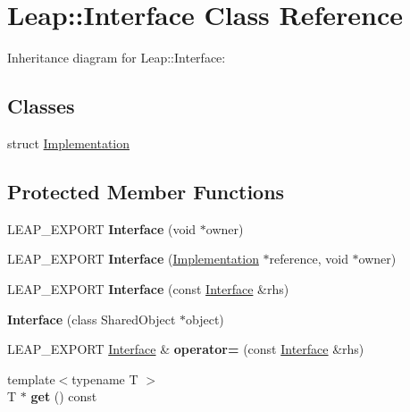 \hypertarget{class_leap_1_1_interface}{}\section{Leap\+:\+:Interface Class Reference}
\label{class_leap_1_1_interface}


Inheritance diagram for Leap\+:\+:Interface\+:
\subsection*{Classes}
\begin{DoxyCompactItemize}
\item 
struct \hyperlink{struct_leap_1_1_interface_1_1_implementation}{Implementation}
\end{DoxyCompactItemize}
\subsection*{Protected Member Functions}
\begin{DoxyCompactItemize}
\item 
\mbox{\label{class_leap_1_1_interface_ac3a173f44d98821f915ae5a873c478dc}} 
L\+E\+A\+P\+\_\+\+E\+X\+P\+O\+RT {\bfseries Interface} (void $\ast$owner)
\item 
\mbox{\label{class_leap_1_1_interface_a0e76882987c7866e17856c699b2490a8}} 
L\+E\+A\+P\+\_\+\+E\+X\+P\+O\+RT {\bfseries Interface} (\hyperlink{struct_leap_1_1_interface_1_1_implementation}{Implementation} $\ast$reference, void $\ast$owner)
\item 
\mbox{\label{class_leap_1_1_interface_a540323027de8d874d86f4ad09f5b7103}} 
L\+E\+A\+P\+\_\+\+E\+X\+P\+O\+RT {\bfseries Interface} (const \hyperlink{class_leap_1_1_interface}{Interface} \&rhs)
\item 
\mbox{\label{class_leap_1_1_interface_a48b7660b77d962b30fa397919901967b}} 
{\bfseries Interface} (class Shared\+Object $\ast$object)
\item 
\mbox{\label{class_leap_1_1_interface_a763c07d957f412613423acf2c9830275}} 
L\+E\+A\+P\+\_\+\+E\+X\+P\+O\+RT \hyperlink{class_leap_1_1_interface}{Interface} \& {\bfseries operator=} (const \hyperlink{class_leap_1_1_interface}{Interface} \&rhs)
\item 
\mbox{\label{class_leap_1_1_interface_a2611db4d5c81a7317d8a5fb019e15aae}} 
{\footnotesize template$<$typename T $>$ }\\T $\ast$ {\bfseries get} () const
\end{DoxyCompactItemize}
